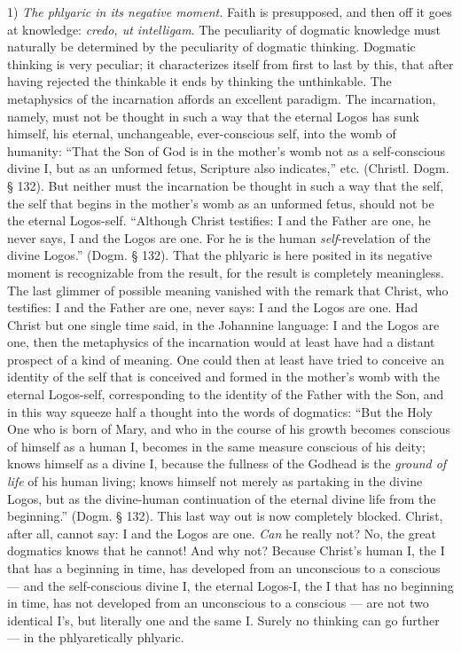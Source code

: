 \documentclass[12pt]{book}
\newcommand{\opage}[1]{\marginnote{\footnotesize\textit{[#1]}}}
\begin{document}
1) \emph{The phlyaric in its negative moment.} Faith is presupposed, and then off it goes at knowledge: \textit{credo, ut intelligam}. The peculiarity of dogmatic knowledge must naturally be determined by the peculiarity of dogmatic thinking. Dogmatic thinking is very peculiar; it characterizes itself from first to last by this, that after having rejected the thinkable it ends by thinking the unthinkable. The metaphysics of the incarnation affords an excellent paradigm. The incarnation, namely, must not be thought in such a way that the eternal Logos has sunk himself, his eternal, unchangeable, ever-conscious self, into the womb of humanity: ``That the Son of God is in the mother's womb not as a self-conscious divine I, but as an unformed fetus, Scripture also indicates,'' etc. (Christl. Dogm. § 132). But neither must the incarnation be thought in such a way that the self, the self that begins in the mother's womb as an unformed fetus, should not be the eternal Logos-self. ``Although Christ testifies: I and the Father are one, he never says, I and the Logos are one. For he is the human \emph{self}-revelation of the divine Logos.'' (Dogm. § 132). That the phlyaric is here posited in its negative moment is recognizable from the result, for the result is completely meaningless. The last glimmer of possible meaning vanished with the remark that Christ, who testifies: I and the Father are one, never says: I and the Logos are one. Had Christ but one single time said, in the Johannine language: I and the Logos are one, then
\opage{92}\setcounter{footnote}{0}%
the metaphysics of the incarnation would at least have had a distant prospect of a kind of meaning. One could then at least have tried to conceive an identity of the self that is conceived and formed in the mother's womb with the eternal Logos-self, corresponding to the identity of the Father with the Son, and in this way squeeze half a thought into the words of dogmatics: ``But the Holy One who is born of Mary, and who in the course of his growth becomes conscious of himself as a human I, becomes in the same measure conscious of his deity; knows himself as a divine I, because the fullness of the Godhead is the \emph{ground of life} of his human living; knows himself not merely as partaking in the divine Logos, but as the divine-human continuation of the eternal divine life from the beginning.'' (Dogm. § 132). This last way out is now completely blocked. Christ, after all, cannot say: I and the Logos are one. \emph{Can} he really not? No, the great dogmatics knows that he cannot! And why not? Because Christ's human I, the I that has a beginning in time, has developed from an unconscious to a conscious --- and the self-conscious divine I, the eternal Logos-I, the I that has no beginning in time, has not developed from an unconscious to a conscious --- are not two identical I's, but literally one and the same I. Surely no thinking can go further --- in the phlyaretically phlyaric.
\end{document}

